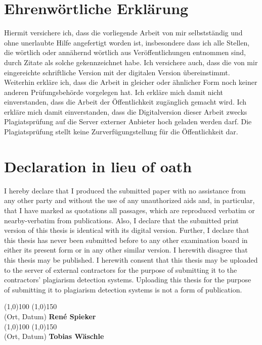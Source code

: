 \clearpage

\section*{Ehrenwörtliche Erklärung}
Hiermit versichere ich, dass die vorliegende Arbeit von mir selbstständig und 
ohne unerlaubte Hilfe angefertigt worden ist, insbesondere dass ich alle Stellen, die wörtlich oder annähernd wörtlich aus Veröffentlichungen entnommen sind, durch Zitate als solche gekennzeichnet habe. Ich versichere auch, dass die von mir eingereichte schriftliche Version mit der digitalen Version übereinstimmt. 
Weiterhin erkläre ich, dass die Arbeit in gleicher oder ähnlicher Form noch keiner anderen Prüfungsbehörde vorgelegen hat. Ich erkläre mich damit nicht einverstanden, dass die Arbeit der Öffentlichkeit zugänglich gemacht wird. Ich erkläre mich damit einverstanden, dass die Digitalversion dieser Arbeit zwecks Plagiatsprüfung auf die Server externer Anbieter hoch geladen werden darf. Die Plagiatsprüfung stellt keine Zurverfügungstellung für die Öffentlichkeit dar.
\section*{Declaration in lieu of oath}
I hereby declare that I produced the submitted paper with no assistance from any other party and without the use of any unauthorized aids and, in particular, that I have marked as quotations all passages, which are reproduced verbatim or nearby-verbatim from publications. Also, I declare that the submitted print version of this thesis is identical with  its digital version. Further, I declare that this thesis has never been submitted before to any other examination board in either its present form or in any other similar version. I herewith disagree that this thesis may be published. 
I herewith consent that this thesis may be uploaded to the server of external contractors for the purpose of submitting it to the contractors’ plagiarism detection systems. Uploading this thesis for the purpose of submitting it to plagiarism detection systems is not a form of publication.\\[1.5cm]
\begin{flushright}
\line(1,0){100} \hfill \line(1,0){150}\\
(Ort, Datum) \hfill \textbf{René Spieker}\\[1.5cm]
\line(1,0){100} \hfill \line(1,0){150}\\
(Ort, Datum) \hfill \textbf{Tobias Wäschle}\\


\end{flushright}



